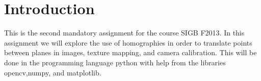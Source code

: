 \section{Introduction}

This is the second mandatory assignment for the course SIGB F2013. In this
assignment we will explore the use of homographies in order to translate points between
planes in images, texture mapping, and camera calibration. This will
be done in the programming language python with help from the libraries
opencv,numpy, and matplotlib.
